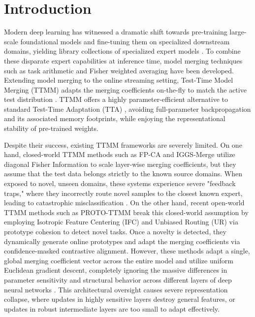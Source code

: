 \documentclass{article}
\theoremstyle{plain}
\theoremstyle{definition}
\theoremstyle{remark}
\begin{document}
\section{Introduction}
\label{sec:intro}
Modern deep learning has witnessed a dramatic shift towards pre-training large-scale foundational models and fine-tuning them on specialized downstream domains, yielding library collections of specialized expert models \cite{wortsman22, radford21}. To combine these disparate expert capabilities at inference time, model merging techniques such as task arithmetic \cite{ilharco22} and Fisher weighted averaging \cite{matena22} have been developed. Extending model merging to the online streaming setting, Test-Time Model Merging (TTMM) adapts the merging coefficients on-the-fly to match the active test distribution \cite{yang24a, hubotter25}. TTMM offers a highly parameter-efficient alternative to standard Test-Time Adaptation (TTA) \cite{wang21, zhang22}, avoiding full-parameter backpropagation and its associated memory footprints, while enjoying the representational stability of pre-trained weights.

Despite their success, existing TTMM frameworks are severely limited. On one hand, closed-world TTMM methods such as FP-CA \cite{luan24} and IGGS-Merge \cite{authors26a} utilize diagonal Fisher Information to scale layer-wise merging coefficients, but they assume that the test data belongs strictly to the known source domains. When exposed to novel, unseen domains, these systems experience severe "feedback traps," where they incorrectly route novel samples to the closest known expert, leading to catastrophic misclassification \cite{authors26b}. On the other hand, recent open-world TTMM methods such as PROTO-TTMM \cite{authors26b} break this closed-world assumption by employing Isotropic Feature Centering (IFC) and Unbiased Routing (UR) via prototype cohesion to detect novel tasks. Once a novelty is detected, they dynamically generate online prototypes and adapt the merging coefficients via confidence-masked contrastive alignment. However, these methods adapt a single, global merging coefficient vector across the entire model and utilize uniform Euclidean gradient descent, completely ignoring the massive differences in parameter sensitivity and structural behavior across different layers of deep neural networks \cite{yadav24, luan24}. This architectural oversight causes severe representation collapse, where updates in highly sensitive layers destroy general features, or updates in robust intermediate layers are too small to adapt effectively.
\end{document}
